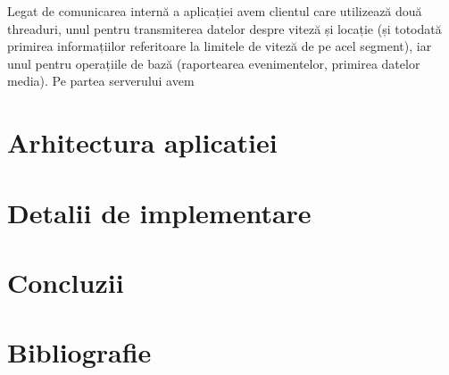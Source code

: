 \documentclass{article}
\begin{document}
Legat de comunicarea internă a aplicației avem clientul care utilizează două threaduri, unul pentru transmiterea datelor despre viteză și locație (și totodată primirea informațiilor referitoare la limitele de viteză de pe acel segment), iar unul pentru operațiile de bază (raportearea evenimentelor, primirea datelor media). Pe partea serverului avem
\section{Arhitectura aplicatiei}
\section{Detalii de implementare}
\section{Concluzii}
\section{Bibliografie}
\end{document}
